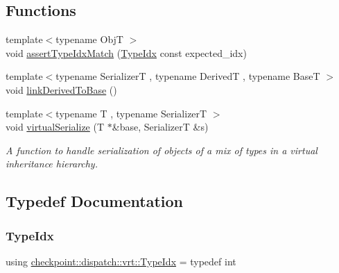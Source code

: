 \subsection*{Functions}
\begin{DoxyCompactItemize}
\item 
{\footnotesize template$<$typename ObjT $>$ }\\void \hyperlink{namespacecheckpoint_1_1dispatch_1_1vrt_a1edd0d1d99a9d53058715b72e8aa7f38}{assert\+Type\+Idx\+Match} (\hyperlink{namespacecheckpoint_1_1dispatch_1_1vrt_acd3f9e6b091bcfbc23dc35ea8ef45d3b}{Type\+Idx} const expected\+\_\+idx)
\item 
{\footnotesize template$<$typename SerializerT , typename DerivedT , typename BaseT $>$ }\\void \hyperlink{namespacecheckpoint_1_1dispatch_1_1vrt_a386bc0347756889ae1d3849cf351110e}{link\+Derived\+To\+Base} ()
\item 
{\footnotesize template$<$typename T , typename SerializerT $>$ }\\void \hyperlink{namespacecheckpoint_1_1dispatch_1_1vrt_ab62fa4e32b27853f6b57caf24b6a77cc}{virtual\+Serialize} (T $\ast$\&base, SerializerT \&s)
\begin{DoxyCompactList}\small\item\em A function to handle serialization of objects of a mix of types in a virtual inheritance hierarchy. \end{DoxyCompactList}\end{DoxyCompactItemize}


\subsection{Typedef Documentation}
\mbox{\label{namespacecheckpoint_1_1dispatch_1_1vrt_acd3f9e6b091bcfbc23dc35ea8ef45d3b}} 
\subsubsection{\texorpdfstring{Type\+Idx}{TypeIdx}}
{\footnotesize\ttfamily using \hyperlink{namespacecheckpoint_1_1dispatch_1_1vrt_acd3f9e6b091bcfbc23dc35ea8ef45d3b}{checkpoint\+::dispatch\+::vrt\+::\+Type\+Idx} = typedef int}



